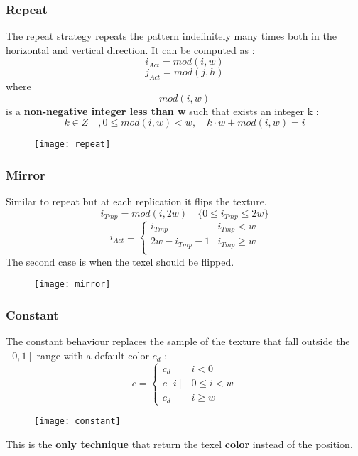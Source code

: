 \subsubsection{Repeat}
The repeat strategy repeats the pattern indefinitely many times both in the horizontal and vertical direction. It can be computed as : 
$$ i_{Act} = mod(i,w) $$
$$ j_{Act} = mod(j,h)$$
where $$ mod(i,w) $$ is a \textbf{non-negative integer less than w} such that exists an integer k : 
$$ k \in Z \quad, 0 \leq mod(i,w) < w ,\quad k \cdot w+mod(i,w)=i$$
\begin{figure}[H]
 \centering
\texttt{[image: repeat]} 
\end{figure}

\subsubsection{Mirror}
Similar to repeat but at each replication it flips the texture.
$$ i_{Tmp} = mod(i,2w) \quad \{ 0 \leq i_{Tmp} \leq 2w \}$$
\[ i_{Act} =
\begin{cases}
	i_{Tmp} & i_{Tmp} < w\\
	2w-i_{Tmp}-1 & i_{Tmp} \geq w \\
\end{cases}
\]
The second case is when the texel should be flipped.
\begin{figure}[H]
 \centering
\texttt{[image: mirror]} 
\end{figure}

\subsubsection{Constant}
The constant behaviour replaces the sample of the texture that fall outside the $[0,1]$ range with a default color $c_d$ :
\[ c =
\begin{cases}
	c_d & i < 0\\
	c[i] & 0 \leq i < w \\
	c_d & i \geq w
\end{cases}
\]
\begin{figure}[H]
 \centering
\texttt{[image: constant]} 
\end{figure}
This is the \textbf{only technique} that return the texel \textbf{color} instead of the position.